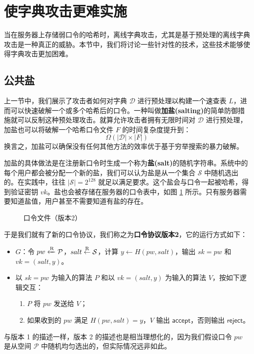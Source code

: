 \section{使字典攻击更难实施}

当在服务器上存储弱口令的哈希时，离线字典攻击，尤其是基于预处理的离线字典攻击是一种真正的威胁。本节中，我们将讨论一些针对性的技术，这些技术能够使得字典攻击更加困难。

\subsection{公共盐}

上一节中，我们展示了攻击者如何对字典 $\mathcal{D}$ 进行预处理以构建一个速查表 $L$，进而可以快速破解一个或多个哈希后的口令。一种叫做\textbf{加盐(salting)}的简单防御措施就可以反制这种预处理攻击。就算允许攻击者拥有无限时间对 $\mathcal{D}$ 进行预处理，加盐也可以将破解一个哈希口令文件 $F$ 的时间复杂度提升到：
$$
\Omega(|\mathcal{D}|\times |F|)
$$
换言之，加盐可以确保没有任何其他方法的效率优于基于穷举搜索的暴力破解。

加盐的具体做法是在注册新口令时生成一个称为\textbf{盐(salt)}的随机字符串。系统中的每个用户都会被分配一个新的盐，我们可以认为盐是从一个集合 $\mathcal{S}$ 中随机选出的。在实践中，往往 $|\mathcal{S}|=2^{128}$ 就足以满足要求。这个盐会与口令一起被哈希，得到验证密钥 $vk$。盐也会被存储在服务器的口令表中，如图 \ref{fig:18-4} 所示。只有服务器需要知道盐值，用户甚至不需要知道有盐的存在。

\begin{figure}
  \centering
  
  \caption{口令文件（版本2）}
  \label{fig:18-4}
\end{figure}

于是我们就有了新的口令协议，我们称之为\textbf{口令协议版本2}，它的运行方式如下：
\begin{itemize}
	\item $G$：令 $pw \xleftarrow{\rm R}\mathcal{P}$，$salt\overset{\rm R}\leftarrow\mathcal{S}$，计算 $y\leftarrow H(pw,salt)$，输出 $sk=pw$ 和 $vk=(salt,y)$。
	\item 以 $sk=pw$ 为输入的算法 $P$ 和以 $vk=(salt,y)$ 为输入的算法 $V$，按如下逻辑交互：
	\begin{enumerate}
		\item $P$ 将 $pw$ 发送给 $V$；
		\item 如果收到的 $pw$ 满足 $H(pw,salt)=y$，$V$ 输出 $\mathsf{accept}$，否则输出 $\mathsf{reject}$。
	\end{enumerate}
\end{itemize}
与版本 1 的描述一样，版本 2 的描述也是相当理想化的，因为我们假设口令 $pw$ 是从空间 $\mathcal{P}$ 中随机均匀选出的，但实际情况远非如此。

